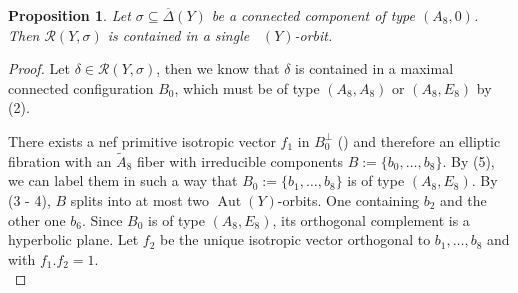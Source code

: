 \documentclass[a4paper]{amsart}
\theoremstyle{definition}
\theoremstyle{plain}
\newtheorem{proposition}[definition]{Proposition}
\DeclareMathOperator{\Aut}{Aut}
\DeclareMathOperator{\aut}{Aut^*}
\newcommand{\R}{\mathcal{R}}
\newcommand{\DeltabarY}{\overline{\Delta}(Y)}
\begin{document}
\begin{proposition}\label{lemma:A8-transitive}
Let $\sigma \subseteq \DeltabarY$ be a connected component of type $(A_8, 0)$.
Then $\R(Y,\sigma)$ is contained in a single $\aut(Y)$-orbit.
\end{proposition}
\begin{proof}
Let $\delta \in \R(Y,\sigma)$, then we know that $\delta$ is contained in a maximal connected configuration $B_0$, which must be of type $(A_8,A_8)$ or $(A_8,E_8)$ by  (2).

There exists a nef primitive isotropic vector $f_1$ in $B_0^\perp$ () and therefore an elliptic fibration with an $\widetilde{A}_8$ fiber with irreducible components $B:=\{b_0,\dots, b_8\}$.
By  (5), we can label them in such a way that $B_0:=\{b_1,\dots, b_8\}$ is of type $(A_8,E_8)$. By  (3 - 4), $B$ splits into at most two $\Aut(Y)$-orbits. One containing $b_2$ and the other one $b_6$.
Since $B_0$ is of type $(A_8,E_8)$, its orthogonal complement is a hyperbolic plane. Let $f_2$ be the unique isotropic vector orthogonal to $b_1,\dots, b_8$ and with $f_1.f_2=1$.\\


\end{proof}
\end{document}
